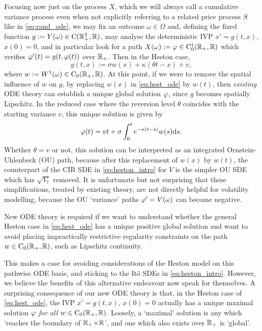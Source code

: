 Focusing now just on the process $X$, which we will always call a cumulative variance process even when not explicitly referring to a related price process $S$ like in \autoref{eq:rand_ode}, we may fix an outcome $\omega\in\Omega$ and, defining the fixed function $g:=Y(\omega)\in\mathrm{C}(\mathbb{R}^2_+,\mathbb{R})$, may analyse the deterministic IVP $x'=g(t,x)$, $x(0)=0$, and in particular look for a path $X(\omega):=\varphi\in\mathrm{C}^1_0(\mathbb{R}_+,\mathbb{R})$ which verifies $\varphi'(t)=g(t,\varphi(t))$ over $\mathbb{R}_+$. Then in the Heston case,
\begin{equation}\label{eq:hest_ode}
    g(t,x) := \sigma w(x) + \kappa\left(\theta t - x\right) + v,
\end{equation}
where $w:=W^1(\omega)\in\mathrm{C}_0(\mathbb{R}_+,\mathbb{R})$. At this point, if we were to remove the spatial influence of $w$ on $g$, by replacing $w(x)$ in \autoref{eq:hest_ode} by $w(t)$, then \emph{existing} ODE theory can establish a unique global solution $\varphi$, since $g$ becomes spatially Lipschitz. In the reduced case where the reversion level $\theta$ coincides with the starting variance $v$, this unique solution is given by
\begin{equation}
    \varphi(t) = v t + \sigma\int_0^te^{-\kappa(t-s)}w(s)\mathrm{d} s.
\end{equation}
Whether $\theta=v$ or not, this solution can be interpreted as an integrated Ornstein-Uhlenbeck (OU) path, because after this replacement of $w(x)$ by $w(t)$, the counterpart of the CIR SDE in \autoref{eq:heston_intro} for $V$ is the simpler OU SDE which has $\sqrt{V_t}$ removed. It is unfortunate but not surprising that these simplifications, treated by existing theory, are not directly helpful for volatility modelling, because the OU `variance' paths $\varphi'=V(\omega)$ can become negative.

New ODE theory is required if we want to understand whether the general Heston case in \autoref{eq:hest_ode} has a unique positive global solution and want to avoid placing impractically restrictive regularity constraints on the path $w\in\mathrm{C}_0(\mathbb{R}_+,\mathbb{R})$, such as Lipschitz continuity.

This makes a case for avoiding considerations of the Heston model on this pathwise ODE basis, and sticking to the It\^o SDEs in \autoref{eq:heston_intro}. However, we believe the benefits of this alternative endeavour now speak for themselves. A surprising consequence of our new ODE theory is that, in the Heston case of \autoref{eq:hest_ode}, the IVP $x'=g(t,x)$, $x(0)=0$ actually has a unique maximal solution $\varphi$ \emph{for all} $w\in\mathrm{C}_0(\mathbb{R}_+,\mathbb{R})$. Loosely, a `maximal' solution is any which `reaches the boundary of $\mathbb{R}_+\!\times\!\mathbb{R}$', and one which also exists over $\mathbb{R}_+$ is `global'.

